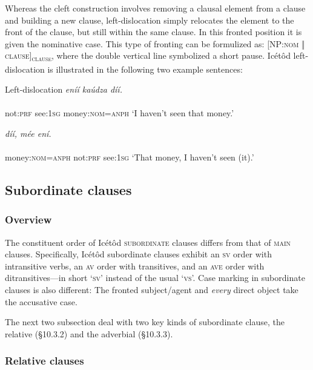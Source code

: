 Whereas the cleft construction involves removing a clausal element from a clause and building a new clause, left-dislocation simply relocates the element to the front of the clause, but still within the same clause. In this fronted position it is given the nominative case. This type of fronting can be formulized as: [NP:\textsc{nom} \textsc{‖}\textsc{ clause]}\textsc{\textsubscript{clause}}, where the double vertical line symbolized a short pause. Icétôd left-dislocation is illustrated in the following two example sentences:




Left-dislocation
\ea\label{ex:}
   \textit{eníí     kaúdza díí.} \\
    \\
not:\textsc{prf}   see:\textsc{1sg}   money:\textsc{nom}=\textsc{anph}
\glt ‘I haven’t seen that money.’ 
\z




\ea\label{ex:}
 \textit{díí,     mée     ení.} \\
    \\
money:\textsc{nom}=\textsc{anph}   not:\textsc{prf}   see:\textsc{1sg}
\glt ‘That money, I haven’t seen (it).’ 
\z






\subsection{Subordinate clauses}
\subsubsection{Overview}

The constituent order of Icétôd \textsc{subordinate} clauses differs from that of \textsc{main} clauses. Specifically, Icétôd subordinate clauses exhibit an \textsc{sv} order with intransitive verbs, an \textsc{av} order with transitives, and an \textsc{ave} order with ditransitives—in short ‘\textsc{sv}’ instead of the usual ‘\textsc{vs}’. Case marking in subordinate clauses is also different: The fronted subject/agent and \textit{every} direct object take the accusative case. 

The next two subsection deal with two key kinds of subordinate clause, the relative (§10.3.2) and the adverbial (§10.3.3).


\subsubsection{Relative clauses}

